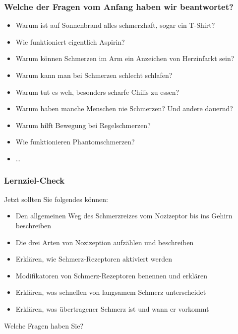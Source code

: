 \documentclass{beamer}
\begin{document}
\begin{frame}
\frametitle{Welche der Fragen vom Anfang haben wir beantwortet?}

\begin{itemize}
\item
\textcolor{theme}{Warum ist auf Sonnenbrand alles schmerzhaft, sogar ein T-Shirt?}
\item
\textcolor{theme}{Wie funktioniert eigentlich Aspirin?} 
\item
\textcolor{theme}{Warum können Schmerzen im Arm ein Anzeichen von Herzinfarkt sein?}
\item
Warum kann man bei Schmerzen schlecht schlafen? 
\item
\textcolor{theme}{Warum tut es weh, besonders scharfe Chilis zu essen?}
\item
Warum haben manche Menschen nie Schmerzen? Und andere dauernd?
\item
\textcolor{theme}{Warum hilft Bewegung bei Regelschmerzen?} 
\item
Wie funktionieren Phantomschmerzen?  
\item
\dots 
\end{itemize}

\end{frame}



 \begin{frame}
\frametitle{Lernziel-Check}


\begin{block}{Jetzt sollten Sie folgendes können:}



\begin{itemize}
\item
Den allgemeinen Weg des Schmerzreizes vom Nozizeptor bis ins Gehirn beschreiben
\item
Die drei Arten von Nozizeption aufzählen und beschreiben
\item
Erklären, wie Schmerz-Rezeptoren aktiviert werden
\item
Modifikatoren von Schmerz-Rezeptoren benennen und erklären
\item
Erklären, was schnellen von langsamem Schmerz unterscheidet
\item
Erklären, was übertragener Schmerz ist und wann er vorkommt
\end{itemize}


\end{block}

\pause

Welche Fragen haben Sie? 

\end{frame}
\end{document}
